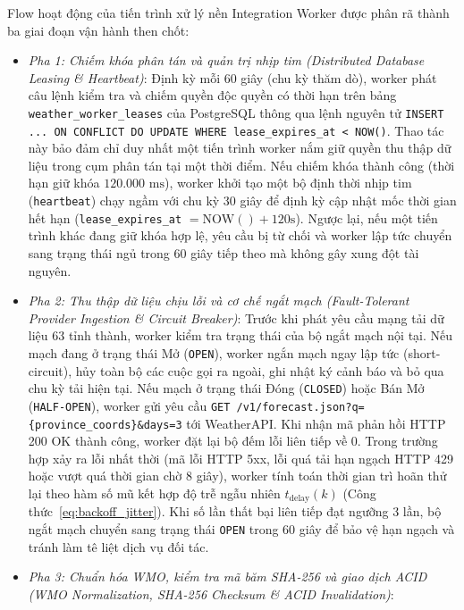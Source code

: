 Flow hoạt động của tiến trình xử lý nền Integration Worker được phân rã thành ba giai đoạn vận hành then chốt:
\begin{itemize}
    \item[-] \textit{Pha 1: Chiếm khóa phân tán và quản trị nhịp tim (Distributed Database Leasing \& Heartbeat)}:
    Định kỳ mỗi 60 giây (chu kỳ thăm dò), worker phát câu lệnh kiểm tra và chiếm quyền độc quyền có thời hạn trên bảng \texttt{weather\_worker\_leases} của PostgreSQL thông qua lệnh nguyên tử \texttt{INSERT ... ON CONFLICT DO UPDATE WHERE lease\_expires\_at < NOW()}. Thao tác này bảo đảm chỉ duy nhất một tiến trình worker nắm giữ quyền thu thập dữ liệu trong cụm phân tán tại một thời điểm. Nếu chiếm khóa thành công (thời hạn giữ khóa $120.000\text{ ms}$), worker khởi tạo một bộ định thời nhịp tim (\texttt{heartbeat}) chạy ngầm với chu kỳ 30 giây để định kỳ cập nhật mốc thời gian hết hạn (\texttt{lease\_expires\_at} $= \text{NOW}() + 120\text{s}$). Ngược lại, nếu một tiến trình khác đang giữ khóa hợp lệ, yêu cầu bị từ chối và worker lập tức chuyển sang trạng thái ngủ trong 60 giây tiếp theo mà không gây xung đột tài nguyên.
    \item[-] \textit{Pha 2: Thu thập dữ liệu chịu lỗi và cơ chế ngắt mạch (Fault-Tolerant Provider Ingestion \& Circuit Breaker)}:
    Trước khi phát yêu cầu mạng tải dữ liệu 63 tỉnh thành, worker kiểm tra trạng thái của bộ ngắt mạch nội tại. Nếu mạch đang ở trạng thái Mở (\texttt{OPEN}), worker ngắn mạch ngay lập tức (short-circuit), hủy toàn bộ các cuộc gọi ra ngoài, ghi nhật ký cảnh báo và bỏ qua chu kỳ tải hiện tại. Nếu mạch ở trạng thái Đóng (\texttt{CLOSED}) hoặc Bán Mở (\texttt{HALF-OPEN}), worker gửi yêu cầu \texttt{GET /v1/forecast.json?q=\{province\_coords\}\&days=3} tới WeatherAPI. Khi nhận mã phản hồi HTTP 200 OK thành công, worker đặt lại bộ đếm lỗi liên tiếp về $0$. Trong trường hợp xảy ra lỗi nhất thời (mã lỗi HTTP 5xx, lỗi quá tải hạn ngạch HTTP 429 hoặc vượt quá thời gian chờ 8 giây), worker tính toán thời gian trì hoãn thử lại theo hàm số mũ kết hợp độ trễ ngẫu nhiên $t_{\text{delay}}(k)$ (Công thức~\eqref{eq:backoff_jitter}). Khi số lần thất bại liên tiếp đạt ngưỡng 3 lần, bộ ngắt mạch chuyển sang trạng thái \texttt{OPEN} trong 60 giây để bảo vệ hạn ngạch và tránh làm tê liệt dịch vụ đối tác.
    \item[-] \textit{Pha 3: Chuẩn hóa WMO, kiểm tra mã băm SHA-256 và giao dịch ACID (WMO Normalization, SHA-256 Checksum \& ACID Invalidation)}:

\end{itemize}
